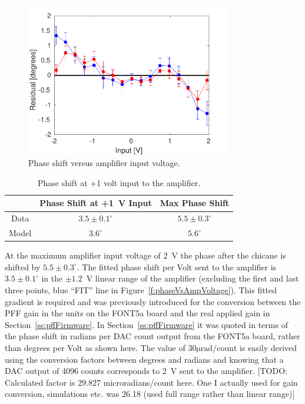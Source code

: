 \begin{figure}
  \centering
  \includegraphics[width=0.8\textwidth]{Figures/commissioning/phaseVsAmpVoltage_residuals}
  \caption{Phase shift versus amplifier input voltage.}
  \label{f:phaseVsAmp_resid}
\end{figure}

\begin{table}
  \begin{center}
    \begin{tabular}{| c | c | c |}
	   \hline
        & Phase Shift at +1~V Input & Max Phase Shift \\ \hline
       Data & \(3.5\pm0.1^\circ\) & \(5.5\pm0.3^\circ\) \\
	   Model & \(3.6^\circ\) & \(5.6^\circ\) \\
 	   \hline
    \end{tabular}
    \caption{Phase shift at +1 volt input to the amplifier.}
  	\label{t:PhaseVsDAC}
  \end{center}
\end{table}

At the maximum amplifier input voltage of \(2\)~V the phase after the chicane is shifted by \(5.5\pm0.3^\circ\). The fitted phase shift per Volt sent to the amplifier is \(3.5\pm0.1^\circ\) in the \(\pm1.2\)~V linear range of the amplifier (excluding the first and last three points, blue ``FIT'' line in Figure~\ref{f:phaseVsAmpVoltage}). This fitted gradient is required and was previously introduced for the conversion between the PFF gain in the units on the FONT5a board and the real applied gain in Section~\ref{ss:pffFirmware}. In Section~\ref{ss:pffFirmware} it was quoted in terms of the phase shift in radians per DAC count output from the FONT5a board, rather than degrees per Volt as shown here. The value of \(30\mathrm{\mu rad/count}\) is easily derived using the conversion factors between degrees and radians and knowing that a DAC output of 4096 counts corresponds to 2~V sent to the amplifier.
[TODO: Calculated factor is 29.827 microradians/count here. One I actually used for gain conversion, simulations etc. was 26.18 (used full range rather than linear range)]

